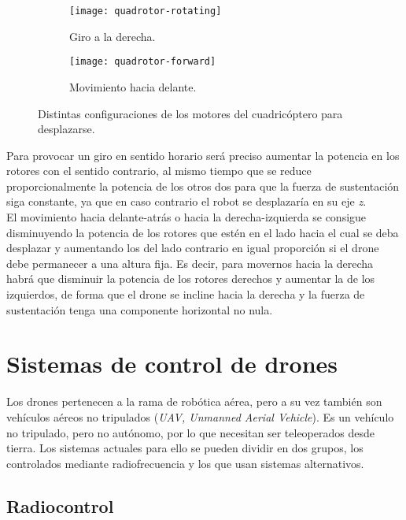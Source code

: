 \begin{figure}[h]
\centering
  \begin{subfigure}[]{60mm}
    \texttt{[image: quadrotor-rotating]}
    \caption{Giro a la derecha.} 
  \end{subfigure}
  \hspace{5pt}
  \begin{subfigure}[]{60mm}
    \texttt{[image: quadrotor-forward]}
    \caption{Movimiento hacia delante.}
  \end{subfigure}
  \caption{Distintas configuraciones de los motores del cuadricóptero para desplazarse.}\label{fig:quadrotor_movements}
\end{figure}



Para provocar un giro en sentido horario será preciso aumentar la potencia en los rotores con el sentido contrario, al mismo tiempo que se reduce proporcionalmente la potencia de los otros dos para que la fuerza de sustentación siga constante, ya que en caso contrario el robot se desplazaría en su eje \emph{z}.\\


El movimiento hacia delante-atrás o hacia la derecha-izquierda se consigue disminuyendo la potencia de los rotores que estén en el lado hacia el cual se deba desplazar y aumentando los del lado contrario en igual proporción si el drone debe permanecer a una altura fija. Es decir, para movernos hacia la derecha habrá que disminuir la potencia de los rotores derechos y aumentar la de los izquierdos, de forma que el drone se incline hacia la derecha y la fuerza de sustentación tenga una componente horizontal no nula.\\


\section{Sistemas de control de drones}

Los drones pertenecen a la rama de robótica aérea, pero a su vez también son vehículos aéreos no tripulados (\emph{UAV, Unmanned  Aerial Vehicle}). Es un vehículo no tripulado, pero no autónomo, por lo que necesitan ser teleoperados desde tierra. Los sistemas actuales para ello se pueden dividir en dos grupos, los controlados mediante radiofrecuencia y los que usan sistemas alternativos.\\

\subsection{Radiocontrol}


